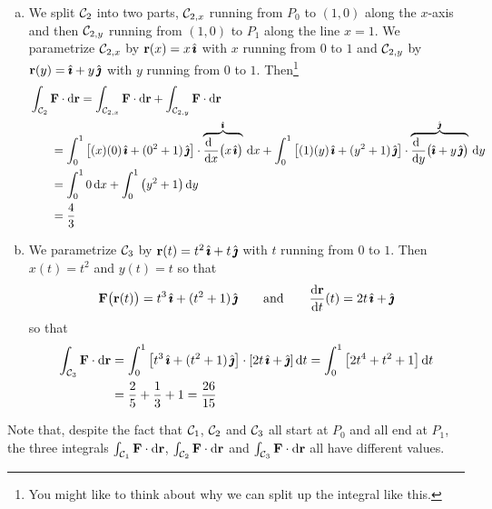 \begin{eg}
\begin{enumerate}[(a)]
\item 
We split $\mathcal{C}_2$ into two parts, $\mathcal{C}_{2,x}$ running from $P_0$ to $(1,0)$
along the $x$-axis and then $\mathcal{C}_{2,y}$ running from $(1,0)$ to $P_1$
along the line $x=1$. 
We parametrize $\mathcal{C}_{2,x}$ by $\mathbf{r}(x) = x\,\hat{\pmb{\imath}}$ with $x$ running from $0$ to $1$
and $\mathcal{C}_{2,y}$ by $\mathbf{r}(y) = \hat{\pmb{\imath}}+y\,\hat{\pmb{\jmath}}$ with $y$ running from $0$ to $1$.
Then\footnote{You might like to think about why we can split up the integral like this.}
\begin{align*}
&\int_{\cC_2}\vF\cdot\dee{\vr}
=\int_{\cC_{2,x}}\vF\cdot\dee{\vr} + \int_{\cC_{2,y}}\vF\cdot\dee{\vr} \\
&\hskip0.25in=\int_{0}^{1}\big[(x) (0)\,\hi + (0^2+1)\,\hj\big]\cdot 
     \overbrace{\diff{\ }{x}\big(x\,\hi\big)}^{\hi}\,\dee{x}
 + \int_{0}^{1}\big[(1) (y)\,\hi + (y^2+1)\,\hj\big]\cdot 
           \overbrace{\diff{\ }{y}\big(\hi+y\,\hj\big)}^{\hj}\,\dee{y} \\
&\hskip0.25in=\int_{0}^{1}0\,\dee{x}
 + \int_{0}^{1}\big(y^2+1\big)\,\dee{y} \\
&\hskip0.25in=\frac{4}{3}
\end{align*}


\item 
We parametrize $\mathcal{C}_3$ by $\mathbf{r}(t) = t^2\,\hat{\pmb{\imath}}+t\,\hat{\pmb{\jmath}}$ with $t$ running from $0$ to $1$.
Then $x(t)=t^2$ and $y(t)=t$ so that
\begin{equation*}
\vF\big(\vr(t)\big) = t^3\,\hi + (t^2+1)\,\hj\qquad\text{and}\qquad
\diff{\vr}{t}(t) = 2t\,\hi + \hj
\end{equation*}
so that
\begin{align*}
\int_{\cC_3}\vF\cdot\dee{\vr}
&%
=\int_{0}^{1}\big[t^3\,\hi + (t^2+1)\,\hj\big]\cdot[2t\,\hi + \hj]\,\dee{t}
=\int_{0}^{1}\big[2t^4+t^2+1\big]\,\dee{t} \\
&=\frac{2}{5}+\frac{1}{3}+1 = \frac{26}{15}
\end{align*}
\end{enumerate}
Note that, despite the fact that $\mathcal{C}_1$, $\mathcal{C}_2$ and $\mathcal{C}_3$ all start at $P_0$
and all end at $P_1$, the three integrals $\int_{\mathcal{C}_1}\mathbf{F}\cdot\mathrm{d}\mathbf{r}$, 
$\int_{\mathcal{C}_2}\mathbf{F}\cdot\mathrm{d}\mathbf{r}$ and $\int_{\mathcal{C}_3}\mathbf{F}\cdot\mathrm{d}\mathbf{r}$ all have different values.


\end{eg}

